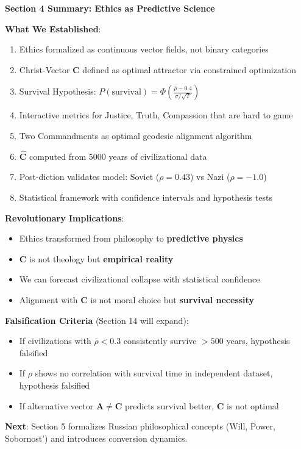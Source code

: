 \documentclass[11pt,a4paper]{article}
\theoremstyle{definition}
\theoremstyle{remark}
\begin{document}
\begin{mdframed}[backgroundcolor=green!10,linewidth=2pt,linecolor=green!70!black]
\textbf{Section 4 Summary: Ethics as Predictive Science}

\textbf{What We Established}:
\begin{enumerate}[nosep]
    \item Ethics formalized as continuous vector fields, not binary categories
    \item Christ-Vector \(\mathbf{C}\) defined as optimal attractor via constrained optimization
    \item Survival Hypothesis: \(P(\text{survival}) = \Phi\left(\frac{\bar{\rho} - 0.4}{\sigma/\sqrt{T}}\right)\)
    \item Interactive metrics for Justice, Truth, Compassion that are hard to game
    \item Two Commandments as optimal geodesic alignment algorithm
    \item \(\hat{\mathbf{C}}\) computed from 5000 years of civilizational data
    \item Post-diction validates model: Soviet (\(\rho = 0.43\)) vs Nazi (\(\rho = -1.0\))
    \item Statistical framework with confidence intervals and hypothesis tests
\end{enumerate}

\textbf{Revolutionary Implications}:
\begin{itemize}[nosep]
    \item Ethics transformed from philosophy to \textbf{predictive physics}
    \item \(\mathbf{C}\) is not theology but \textbf{empirical reality}
    \item We can forecast civilizational collapse with statistical confidence
    \item Alignment with \(\mathbf{C}\) is not moral choice but \textbf{survival necessity}
\end{itemize}

\textbf{Falsification Criteria} (Section 14 will expand):
\begin{itemize}[nosep]
    \item If civilizations with \(\bar{\rho} < 0.3\) consistently survive \(>500\) years, hypothesis falsified
    \item If \(\rho\) shows no correlation with survival time in independent dataset, hypothesis falsified
    \item If alternative vector \(\mathbf{A} \neq \mathbf{C}\) predicts survival better, \(\mathbf{C}\) is not optimal
\end{itemize}

\textbf{Next}: Section 5 formalizes Russian philosophical concepts (Will, Power, Sobornost') and introduces conversion dynamics.
\end{mdframed}
\end{document}
